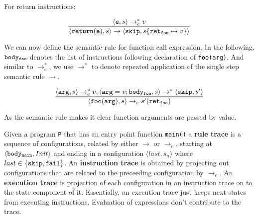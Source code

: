 For return instructions:


\[\frac{\langle {\tt e}, s \rangle \rightarrow_{e}^{*} { v} }{\langle {\tt return(e)}, s \rangle \rightarrow \langle {\bf \tt skip}, s\{{\tt ret_{foo}} \mapsto v\}\rangle }\]

We can now define the semantic rule for function call expression. In
the following, \({\tt body_{foo}}\) denotes the list of instructions
following declaration of {\tt foo(arg)}. And similar to
\(\rightarrow_{e}^{*}\), we use \(\rightarrow^{*}\) to denote repeated
application of the single step semantic rule \(\rightarrow\). 


\[\frac{{\langle {\tt arg}, s \rangle \rightarrow_{e}^{*} { v}}, {\langle {\tt arg} = v; {\tt body_{foo}}, s \rangle \rightarrow^{*} \langle {\bf \tt skip}, s'\rangle} }{\langle {\tt foo(arg)}, s \rangle \rightarrow_{e} {s'({\tt ret_{foo}})}}\]

As the semantic rule makes it clear function arguments are passed by
value.

Given a program {\tt P} that has an entry point function {\tt main()}
a {\bf rule trace} is a sequence of configurations, related by either
\(\rightarrow\) or \(\rightarrow_e\), starting at \(\langle{\tt
  body_{main}}, Init \rangle\) and ending in a configuration \(\langle
last, s_n\rangle\) where \(last \in \{{\bf \tt skip}, {\bf \tt fail}\}\). An {\bf
  instruction trace} is obtained by projecting out configurations that
are related to the preceeding configuration by \(\rightarrow_e\). An
{\bf execution trace} is projection of each configuration in an
instruction trace on to the state component of it. Essentially, an
execution trace just keeps next states from executing
instructions. Evaluation of expressions don't contribute to the trace.


